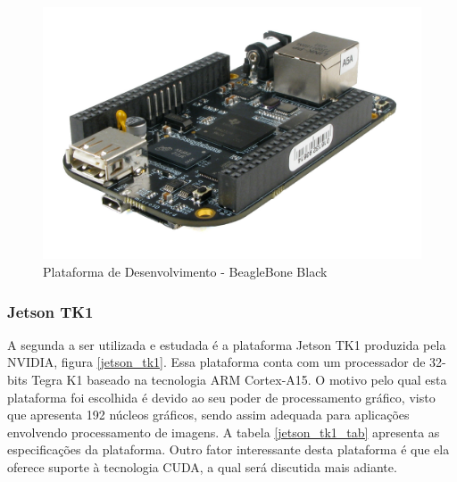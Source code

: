 \begin{figure}[H]
	\centering
	\includegraphics[scale=0.10]{./Resources/bbb.jpg}
	\caption{Plataforma de Desenvolvimento - BeagleBone Black}
	\label{bbb}
\end{figure}


\subsubsection{Jetson TK1}

A segunda a ser utilizada e estudada é a plataforma Jetson TK1 produzida pela NVIDIA, figura \ref{jetson_tk1}. Essa plataforma conta com um processador de 32-bits Tegra K1 baseado na tecnologia ARM Cortex-A15. O motivo pelo qual esta plataforma foi escolhida é devido ao seu poder de processamento gráfico, visto que apresenta 192 núcleos gráficos, sendo assim adequada para aplicações envolvendo processamento de imagens. A tabela \ref{jetson_tk1_tab} apresenta as especificações da plataforma. Outro fator interessante desta plataforma é que ela oferece suporte à tecnologia CUDA, a qual será discutida mais adiante.

